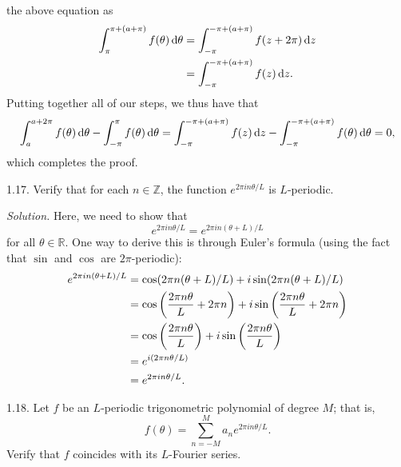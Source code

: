 \documentclass{article}
\newcommand{\R}{\mathbb{R}}
\newcommand{\Z}{\mathbb{Z}}
\begin{document}
the above equation as
%
\begin{align*}
    \int_{\pi}^{\pi + (a + \pi)} f(\theta) \dif \theta
    &= \int_{- \pi}^{-\pi + (a + \pi)} f(z + 2 \pi) \dif z \\
    &= \int_{- \pi}^{-\pi + (a + \pi)} f(z) \dif z
    .
\end{align*}
%
Putting together all of our steps, we thus have that
%
\begin{equation*}
    \int_a^{a + 2 \pi} f(\theta) \dif \theta - \int_{-\pi}^\pi f(\theta) \dif \theta
    =
    \int_{- \pi}^{-\pi + (a + \pi)} f(z) \dif z
    - \int_{-\pi}^{-\pi + (a + \pi)} f(\theta) \dif \theta
    = 0
    ,
\end{equation*}
%
which completes the proof.

\newpage

1.17. Verify that for each $n \in \Z$, the function
  $e^{2 \pi i n \theta / L}$ is $L$-periodic.

\textit{Solution.} Here, we need to show that
%
\begin{equation*}
    e^{2 \pi i n \theta / L} = e^{2 \pi i n (\theta + L) / L}
\end{equation*}
%
for all $\theta \in \R$. One way to derive this is through Euler's
formula (using the fact that $\sin$ and $\cos$ are $2 \pi$-periodic):
%
\begin{align*}
    e^{2 \pi i n (\theta + L) / L}
    &=
    \cos(2 \pi n (\theta + L) / L)
    + i \sin(2 \pi n (\theta + L) / L)
    \\
    &=
    \cos\del{\frac{2 \pi n \theta}{L} + 2 \pi n}
    + i \sin\del{\frac{2 \pi n \theta}{L} + 2 \pi n}
    \\
    &=
    \cos\del{\frac{2 \pi n \theta}{L}}
    + i \sin\del{\frac{2 \pi n \theta}{L}}
    \\
    &=
    e^{i (2 \pi n \theta / L)}
    \\
    &=
    e^{2 \pi i n \theta / L}
    .
\end{align*}

\newpage

1.18. Let $f$ be an $L$-periodic trigonometric polynomial of degree $M$;
  that is,
%
\begin{equation*}
    f(\theta) = \sum_{n = - M}^M a_n e^{2 \pi i n \theta / L}
    .
\end{equation*}
%
Verify that $f$ coincides with its $L$-Fourier series.
\end{document}
